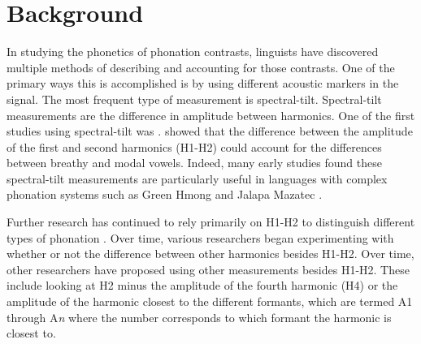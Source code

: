 \documentclass[12pt, letterpaper]{article}
\begin{document}
\section{Background} \label{sec:Background}

In studying the phonetics of phonation contrasts, linguists have discovered multiple methods of describing and accounting for those contrasts. One of the primary ways this is accomplished is by using different acoustic markers in the signal. The most frequent type of measurement is spectral-tilt. Spectral-tilt measurements are the difference in amplitude between harmonics. One of the first studies using spectral-tilt was \cite{fischer-jorgensenPhoneticAnalysisBreathy1968}. \citeauthor{fischer-jorgensenPhoneticAnalysisBreathy1968} showed that the difference between the amplitude of the first and second harmonics (H1-H2) could account for the differences between breathy and modal vowels. Indeed, many early studies found these spectral-tilt measurements are particularly useful in languages with complex phonation systems such as Green Hmong \citep{huffmanMeasuresPhonationType1987,andruskiPhonationTypesProduction2000} and Jalapa Mazatec \citep{silvermanPhoneticStructuresJalapa1995,blankenshipTimeCourseBreathiness1997}.

Further research has continued to rely primarily on H1-H2 to distinguish different types of phonation \citep[e.g.,][]{huffmanMeasuresPhonationType1987,klattAnalysisSynthesisPerception1990}. Over time, various researchers began experimenting with whether or not the difference between other harmonics besides H1-H2. Over time, other researchers have proposed using other measurements besides H1-H2. These include looking at H2 minus the amplitude of the fourth harmonic (H4) or the amplitude of the harmonic closest to the different formants, which are termed A1 through A\textit{n} where the number corresponds to which formant the harmonic is closest to.  
\end{document}

